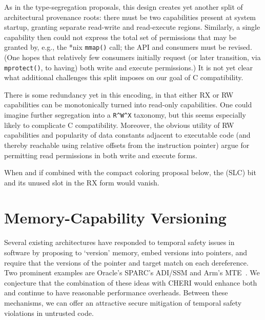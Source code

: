 As in the type-segregation proposals, this design creates yet another split
of architectural provenance roots: there must be two capabilities present at
system startup, granting separate read-write and read-execute regions.
Similarly, a single capability then could not express the total set of
permissions that may be granted by, e.g., the *nix \texttt{mmap()} call; the
API and consumers must be revised.  (One hopes that relatively few consumers
initially request (or later transition, via \texttt{mprotect()}, to having)
both write and execute permissions.)  It is not yet clear what additional
challenges this split imposes on our goal of C compatibility.

There is some redundancy yet in this encoding, in that either RX or RW
capabilities can be monotonically turned into read-only capabilities.  One
could imagine further segregation into a
\texttt{R\textasciicircum{}W\textasciicircum{}X} taxonomy, but this seems
especially likely to complicate C compatibility.  Moreover, the obvious
utility of RW capabilities and popularity of data constants adjacent to
executable code (and thereby reachable using relative offsets from the
instruction pointer) argue for permitting read permissions in both write and
execute forms.

When and if combined with the compact coloring proposal below, the
\cappermSLC (SLC) bit and its unused slot in the RX form
would vanish.

\section{Memory-Capability Versioning} %
\label{app:exp:versioning}

Several existing architectures have responded to temporal safety issues in
software by proposing to `version' memory, embed versions into pointers,
and require that the versions of the pointer and target match on each
dereference.  Two prominent examples are Oracle's SPARC's ADI/SSM
\cite{sparc-m7-adi} and Arm's MTE~\cite{arm-a64-v8-a-beta}.  We conjecture
that the combination of these ideas with CHERI would enhance both and continue
to have reasonable performance overheads.  Between these mechanisms, we can
offer an attractive secure mitigation of temporal safety violations in
untrusted code.

